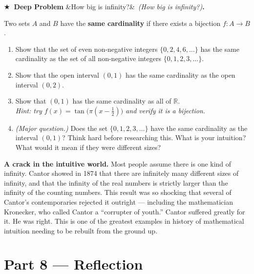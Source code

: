 \documentclass[12pt, a4paper]{article}
\newcounter{problem}
\newcounter{deepproblem}
\newenvironment{deepproblem}[1][]{%
  \refstepcounter{deepproblem}%
  \par\vspace{6pt}%
  \noindent\textbf{\color{NavyBlue}$\bigstar$\ Deep Problem \thedeepproblem}%
  \ifx&#1&\else\ \textit{(#1)}\fi\textbf{.}\enskip
}{\par\vspace{4pt}}
\begin{document}
\begin{deepproblem}[How big is infinity?]
Two sets $A$ and $B$ have the \textbf{same cardinality} if there exists a bijection $f : A \to B$.
\begin{enumerate}[label=(\alph*)]
  \item Show that the set of even non-negative integers $\{0, 2, 4, 6, \ldots\}$ has the same cardinality as the set of all non-negative integers $\{0, 1, 2, 3, \ldots\}$.
  \item Show that the open interval $(0,1)$ has the same cardinality as the open interval $(0,2)$.
  \item Show that $(0,1)$ has the same cardinality as all of $\mathbb{R}$.\\ \textit{Hint: try $f(x) = \tan\!\bigl(\pi(x - \tfrac{1}{2})\bigr)$ and verify it is a bijection.}
  \item \textit{(Major question.)} Does the set $\{0,1,2,3,\ldots\}$ have the same cardinality as the interval $(0,1)$? Think hard before researching this. What is your intuition? What would it mean if they were different sizes?
\end{enumerate}

\medskip
\begin{thought}
\textbf{A crack in the intuitive world.}
Most people assume there is one kind of infinity. Cantor showed in 1874 that there are infinitely many different sizes of infinity, and that the infinity of the real numbers is strictly larger than the infinity of the counting numbers. This result was so shocking that several of Cantor's contemporaries rejected it outright --- including the mathematician Kronecker, who called Cantor a ``corrupter of youth.'' Cantor suffered greatly for it. He was right. This is one of the greatest examples in history of mathematical intuition needing to be rebuilt from the ground up.
\end{thought}
\end{deepproblem}

\bigskip

\section{Part 8 \texorpdfstring{---}{--} Reflection}
\end{document}
